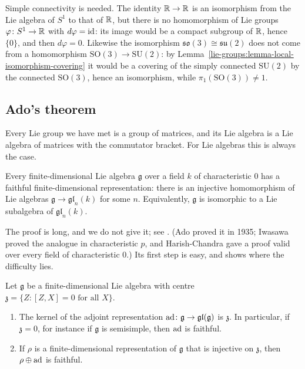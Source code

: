 \begin{counterexample}\label{lie-groups:counterexample-integrate}
Simple connectivity is needed. The identity $\mathbb{R} \to \mathbb{R}$ is an isomorphism from the Lie algebra of $S^1$ to that of $\mathbb{R}$, but there is no homomorphism of Lie groups
$\varphi \colon S^1 \to \mathbb{R}$ with $d\varphi = \mathrm{id}$: its image would be a compact subgroup of $\mathbb{R}$, hence $\{0\}$, and then $d\varphi = 0$. Likewise the isomorphism
$\mathfrak{so}(3) \cong \mathfrak{su}(2)$ does not come from a homomorphism $\mathrm{SO}(3) \to \mathrm{SU}(2)$: by Lemma~\ref{lie-groups:lemma-local-isomorphism-covering}
it would be a covering of the simply connected $\mathrm{SU}(2)$ by the connected $\mathrm{SO}(3)$, hence an isomorphism, while $\pi_1(\mathrm{SO}(3)) \neq 1$.
\end{counterexample}

\subsection{Ado's theorem}\label{lie-groups:subsection-ado}

Every Lie group we have met is a group of matrices, and its Lie algebra is a Lie algebra of matrices with the commutator bracket. For Lie algebras this is always the case.

\begin{theorem}[Ado]\label{lie-groups:theorem-ado}
Every finite-dimensional Lie algebra $\mathfrak{g}$ over a field $k$ of characteristic $0$ has a faithful finite-dimensional representation: there is an injective
homomorphism of Lie algebras $\mathfrak{g} \to \mathfrak{gl}_n(k)$ for some $n$. Equivalently, $\mathfrak{g}$ is isomorphic to a Lie subalgebra of $\mathfrak{gl}_n(k)$.
\end{theorem}

The proof is long, and we do not give it; see \cite[Appendix B]{knapp-lie}. (Ado proved it in 1935; Iwasawa proved the analogue in characteristic $p$, and Harish-Chandra
gave a proof valid over every field of characteristic $0$.) Its first step is easy, and shows where the difficulty lies.

\begin{proposition}\label{lie-groups:proposition-ado-centre}
Let $\mathfrak{g}$ be a finite-dimensional Lie algebra with centre $\mathfrak{z} = \{Z : [Z, X] = 0 \text{ for all } X\}$.
\begin{enumerate}
\item The kernel of the adjoint representation $\operatorname{ad} \colon \mathfrak{g} \to \mathfrak{gl}(\mathfrak{g})$ is $\mathfrak{z}$. In particular, if $\mathfrak{z} = 0$, for instance if
$\mathfrak{g}$ is semisimple, then $\operatorname{ad}$ is faithful.
\item If $\rho$ is a finite-dimensional representation of $\mathfrak{g}$ that is injective on $\mathfrak{z}$, then $\rho \oplus \operatorname{ad}$ is faithful.
\end{enumerate}
\end{proposition}

